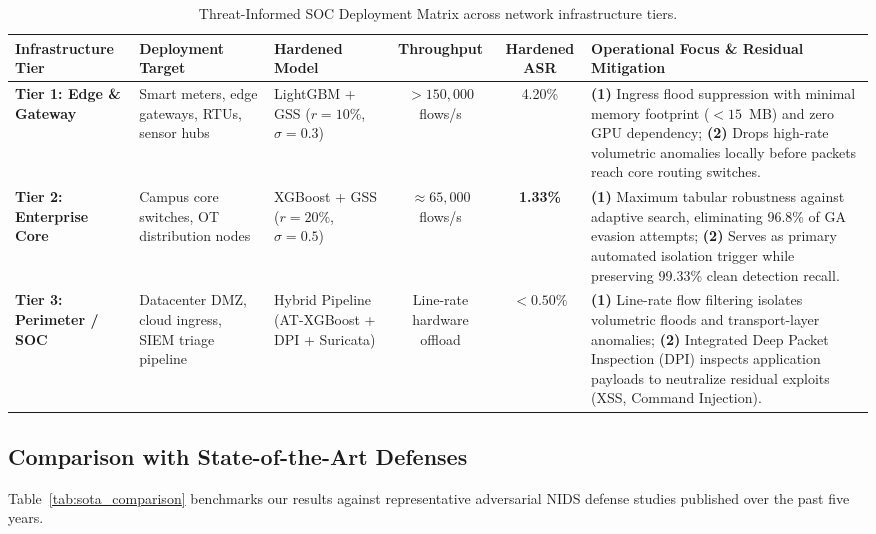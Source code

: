 \documentclass[final,5p,times,twocolumn]{elsarticle}
\begin{document}
\begin{table}[t]
\centering
\footnotesize
\renewcommand{\arraystretch}{1.25}
\caption{Threat-Informed SOC Deployment Matrix across network infrastructure tiers.}
\label{tab:soc_matrix}
\begin{tabularx}{\textwidth}{p{2.9cm} p{2.6cm} p{2.4cm} c c X}
\toprule
\textbf{Infrastructure Tier} & \textbf{Deployment Target} & \textbf{Hardened Model} & \textbf{Throughput} & \textbf{Hardened ASR} & \textbf{Operational Focus \& Residual Mitigation} \\
\midrule
\textbf{Tier 1: Edge \& Gateway} & Smart meters, edge gateways, RTUs, sensor hubs & LightGBM + GSS ($r=10\%$, $\sigma=0.3$) & $>150,000$ flows/s & 4.20\% & 
\textbf{(1)} Ingress flood suppression with minimal memory footprint ($<15$~MB) and zero GPU dependency; \newline
\textbf{(2)} Drops high-rate volumetric anomalies locally before packets reach core routing switches. \\
\addlinespace[3pt]
\midrule
\textbf{Tier 2: Enterprise Core} & Campus core switches, OT distribution nodes & XGBoost + GSS ($r=20\%$, $\sigma=0.5$) & $\approx 65,000$ flows/s & \textbf{1.33\%} & 
\textbf{(1)} Maximum tabular robustness against adaptive search, eliminating 96.8\% of GA evasion attempts; \newline
\textbf{(2)} Serves as primary automated isolation trigger while preserving 99.33\% clean detection recall. \\
\addlinespace[3pt]
\midrule
\textbf{Tier 3: Perimeter / SOC} & Datacenter DMZ, cloud ingress, SIEM triage pipeline & Hybrid Pipeline (AT-XGBoost + DPI + Suricata) & Line-rate hardware offload & $<0.50\%$ & 
\textbf{(1)} Line-rate flow filtering isolates volumetric floods and transport-layer anomalies; \newline
\textbf{(2)} Integrated Deep Packet Inspection (DPI) inspects application payloads to neutralize residual exploits (XSS, Command Injection). \\
\bottomrule
\end{tabularx}
\end{table}

\subsection{Comparison with State-of-the-Art Defenses}
Table~\ref{tab:sota_comparison} benchmarks our results against representative adversarial NIDS defense studies published over the past five years.
\end{document}
